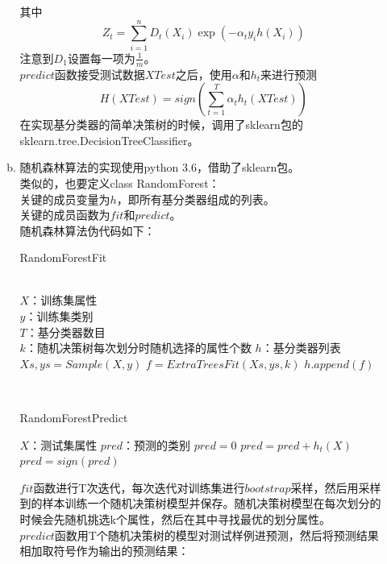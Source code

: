 \documentclass[a4paper,UTF8]{article}
\numberwithin{equation}{section}
\begin{document}
\begin{enumerate}[1.]
\begin{enumerate}[a.]
其中
\begin{equation}
Z_t = \sum_{i=1}^{n}D_t(X_i)\exp(-\alpha_ty_ih(X_i))
\end{equation}
注意到$D_1$设置每一项为$\frac{1}{m}$。\\
$predict$函数接受测试数据$XTest$之后，使用$\alpha$和$h_t$来进行预测
\begin{equation}
H(XTest) = sign(\sum_{t=1}^{T}\alpha_th_t(XTest))
\end{equation}
在实现基分类器的简单决策树的时候，调用了sklearn包的sklearn.tree.DecisionTreeClassifier。
\item 随机森林算法的实现使用python 3.6，借助了sklearn包。\\
类似的，也要定义class RandomForest：\\
关键的成员变量为$h$，即所有基分类器组成的列表。\\
关键的成员函数为$fit$和$predict$。\\
随机森林算法伪代码如下：\\
\begin{algorithm}[!h]  
	\caption{RandomForestFit}  
	\begin{algorithmic}[1]  
		\Require\\  
		$X$：训练集属性\\
		$y$：训练集类别\\
		$T$：基分类器数目\\
		$k$：随机决策树每次划分时随机选择的属性个数
		\Ensure  
		$h$：基分类器列表 
		\State $Xs, ys = Sample(X, y)$
		\State $f = ExtraTreesFit(Xs, ys, k)$
		\State $h.append(f)$
		\EndFor
		\label{code:End1}  
	\end{algorithmic}  
\end{algorithm}\\
\begin{algorithm}[!h]  
	\caption{RandomForestPredict}  
	\begin{algorithmic}[1]  
		\Require
		$X$：测试集属性
		\Ensure  
		$pred$：预测的类别
		\State $pred = 0$ 
		\State $pred = pred + h_t(X)$
		\EndFor
		\State $pred = sign(pred)$
		\label{code:End2}  
	\end{algorithmic}  
\end{algorithm}
$fit$函数进行T次迭代，每次迭代对训练集进行$bootstrap$采样，然后用采样到的样本训练一个随机决策树模型并保存。随机决策树模型在每次划分的时候会先随机挑选k个属性，然后在其中寻找最优的划分属性。\\
$predict$函数用T个随机决策树的模型对测试样例进预测，然后将预测结果相加取符号作为输出的预测结果：

\end{enumerate}
\end{enumerate}
\end{document}
